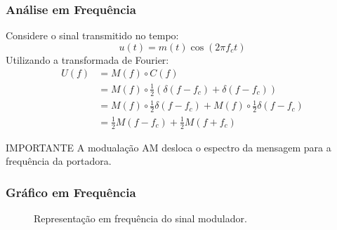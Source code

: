\documentclass[10pt,hyperref={pdfpagemode=FullScreen},aspectratio=169]{beamer}
\begin{document}
\begin{frame}
    \frametitle{Análise em Frequência}

    Considere o sinal transmitido no tempo:
$$
 u(t) = m(t)\cos(2\pi f_c t) 
$$
Utilizando a transformada de Fourier:
\begin{align}
    U(f) &= M(f) \circ C(f) \nonumber \\
      &= M(f) \circ \frac{1}{2}(\delta (f - f_c) + \delta (f - f_c))  \nonumber \\
      &=  M(f) \circ \frac{1}{2}\delta(f - f_c) +  M(f) \circ \frac{1}{2}\delta(f - f_c) \nonumber \\ 
      &= \frac{1}{2} M(f - f_c) + \frac{1}{2}M(f + f_c)
\end{align}
 

\begin{block}{IMPORTANTE}
    A modualação AM desloca o espectro da mensagem para a frequência da portadora.   
\end{block} 

\end{frame}

\begin{frame}
  \frametitle{Gráfico em Frequência}
 

  \begin{figure}[h!]
    \begin{center}
      \caption{Representação em frequência do sinal modulador.}
    \end{center}
  \end{figure}

\end{frame}
\end{document}
